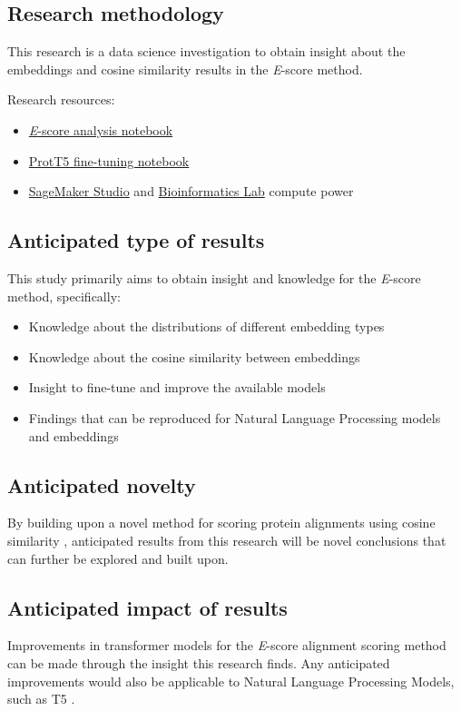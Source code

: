 \documentclass[
	letterpaper, %
	10pt, %
]{journalArticle}
\begin{document}
\subsection{Research methodology}
This research is a data science investigation to obtain insight about the embeddings and cosine similarity results in the \textit{E}-score method.

\noindent Research resources:
\begin{itemize}[noitemsep]
    \item{\href{https://github.com/rgavigan/e-score}{\textit{E}-score analysis notebook}}
    \item{\href{https://github.com/agemagician/ProtTrans/tree/master/Fine-Tuning}{ProtT5 fine-tuning notebook}}
    \item{\href{https://aws.amazon.com/sagemaker/studio/}{SageMaker Studio} and \href{https://www.csd.uwo.ca/~ilie/lab.html}{Bioinformatics Lab} compute power}
\end{itemize}

\subsection{Anticipated type of results}
This study primarily aims to obtain insight and knowledge for the \textit{E}-score method, specifically:
\begin{itemize}
    \item{Knowledge about the distributions of different embedding types}
    \item{Knowledge about the cosine similarity between embeddings}
    \item{Insight to fine-tune and improve the available models}
    \item{Findings that can be reproduced for Natural Language Processing models and embeddings}
\end{itemize}

\subsection{Anticipated novelty}
By building upon a novel method for scoring protein alignments using cosine similarity \autocite{Ashrafzadeh:2023}, anticipated results from this research will be novel conclusions that can further be explored and built upon.

\subsection{Anticipated impact of results}
Improvements in transformer models for the \textit{E}-score alignment scoring method can be made through the insight this research finds. Any anticipated improvements would also be applicable to Natural Language Processing Models, such as T5 \autocite{Raffel:2020}.
\end{document}
